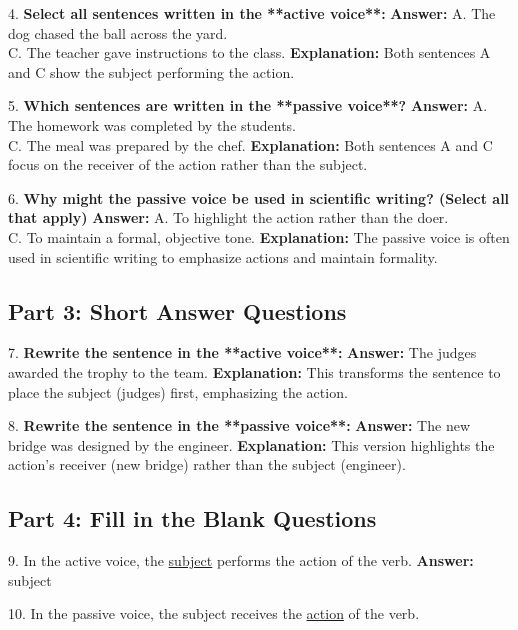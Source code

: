 \documentclass[12pt]{article}
\begin{document}
4. \textbf{Select all sentences written in the **active voice**:}  
\textbf{Answer:} A. The dog chased the ball across the yard. \\
C. The teacher gave instructions to the class.  
\textbf{Explanation:} Both sentences A and C show the subject performing the action.

\vspace{1cm}
5. \textbf{Which sentences are written in the **passive voice**?}  
\textbf{Answer:} A. The homework was completed by the students. \\
C. The meal was prepared by the chef.  
\textbf{Explanation:} Both sentences A and C focus on the receiver of the action rather than the subject.

\vspace{1cm}
6. \textbf{Why might the passive voice be used in scientific writing? (Select all that apply)}  
\textbf{Answer:} A. To highlight the action rather than the doer. \\
C. To maintain a formal, objective tone.  
\textbf{Explanation:} The passive voice is often used in scientific writing to emphasize actions and maintain formality.

\subsection*{Part 3: Short Answer Questions}

7. \textbf{Rewrite the sentence in the **active voice**:}  
\textbf{Answer:} The judges awarded the trophy to the team.  
\textbf{Explanation:} This transforms the sentence to place the subject (judges) first, emphasizing the action.

\vspace{1cm}
8. \textbf{Rewrite the sentence in the **passive voice**:}  
\textbf{Answer:} The new bridge was designed by the engineer.  
\textbf{Explanation:} This version highlights the action's receiver (new bridge) rather than the subject (engineer).

\subsection*{Part 4: Fill in the Blank Questions}

9. In the active voice, the \underline{subject} performs the action of the verb.  
\textbf{Answer:} subject

10. In the passive voice, the subject receives the \underline{action} of the verb.  
\end{document}

